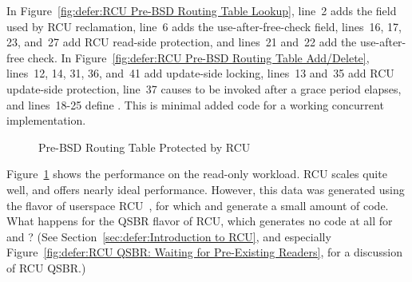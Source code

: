 In Figure~\ref{fig:defer:RCU Pre-BSD Routing Table Lookup},
line~2 adds the  field used by RCU reclamation,
line~6 adds the  use-after-free-check field,
lines~16, 17, 23, and~27 add RCU read-side protection,
and lines~21 and~22 add the use-after-free check.
In Figure~\ref{fig:defer:RCU Pre-BSD Routing Table Add/Delete},
lines~12, 14, 31, 36, and~41 add update-side locking,
lines~13 and~35 add RCU update-side protection,
line~37 causes  to be invoked after a grace period elapses,
and lines~18-25 define .
This is minimal added code for a working concurrent implementation.

\begin{figure}[tb]
\centering
{}
\caption{Pre-BSD Routing Table Protected by RCU}
\label{fig:defer:Pre-BSD Routing Table Protected by RCU}
\end{figure}

Figure~\ref{fig:defer:Pre-BSD Routing Table Protected by RCU}
shows the performance on the read-only workload.
RCU scales quite well, and offers nearly ideal performance.
However, this data was generated using the 
flavor of userspace
RCU~\cite{MathieuDesnoyers2009URCU,PaulMcKenney2013LWNURCU},
for which  and 
generate a small amount of code.
What happens for the QSBR flavor of RCU, which generates no code at all
for  and ?
(See Section~\ref{sec:defer:Introduction to RCU},
and especially
Figure~\ref{fig:defer:RCU QSBR: Waiting for Pre-Existing Readers},
for a discussion of RCU QSBR.)

